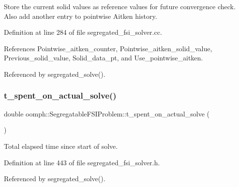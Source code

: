 Store the current solid values as reference values for future convergence check. Also add another entry to pointwise Aitken history. 

Definition at line 284 of file segregated\+\_\+fsi\+\_\+solver.\+cc.



References Pointwise\+\_\+aitken\+\_\+counter, Pointwise\+\_\+aitken\+\_\+solid\+\_\+value, Previous\+\_\+solid\+\_\+value, Solid\+\_\+data\+\_\+pt, and Use\+\_\+pointwise\+\_\+aitken.



Referenced by segregated\+\_\+solve().

\mbox{\label{classoomph_1_1SegregatableFSIProblem_adaaaa08352182dc5e0a38c7003cb7a6b}} 
\subsubsection{\texorpdfstring{t\+\_\+spent\+\_\+on\+\_\+actual\+\_\+solve()}{t\_spent\_on\_actual\_solve()}}
{\footnotesize\ttfamily double oomph\+::\+Segregatable\+F\+S\+I\+Problem\+::t\+\_\+spent\+\_\+on\+\_\+actual\+\_\+solve (\begin{DoxyParamCaption}{ }\end{DoxyParamCaption})\hspace{0.3cm}{\ttfamily [inline]}}



Total elapsed time since start of solve. 



Definition at line 443 of file segregated\+\_\+fsi\+\_\+solver.\+h.



Referenced by segregated\+\_\+solve().

\mbox{\label{classoomph_1_1SegregatableFSIProblem_a9da3017952982a64496ff9c16ca7024c}} 
